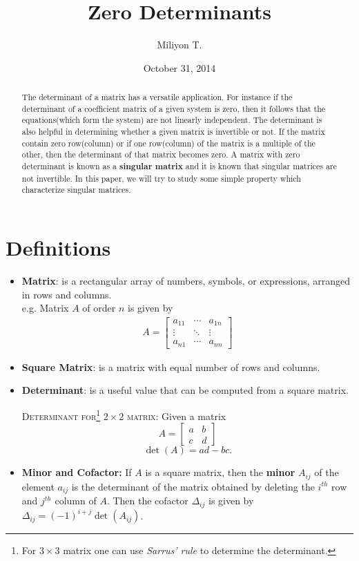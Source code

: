 \documentclass[12pt]{article}
\theoremstyle{definition}
\theoremstyle{remark}
\begin{document}
\nocite{}

\title{Zero Determinants}
\date{October 31, 2014}
\author{Miliyon T.}
\maketitle

\begin{abstract}
  The determinant of a matrix has a versatile application. For instance if the determinant of a coefficient matrix of a given system is zero, then it follows that the equations(which form the system) are not linearly independent. The determinant is also helpful in determining whether a given matrix is invertible or not. If the matrix contain zero row(column) or if one row(column) of the matrix is a multiple of the other, then the determinant of that matrix becomes zero. A matrix with zero determinant is known as a \textbf{singular matrix} and it is known that singular matrices are not invertible. In this paper, we will try to study some simple property which characterize singular matrices.
\end{abstract}

\section{Definitions}

\begin{itemize}
\item \textbf{Matrix}: is a rectangular array of numbers, symbols, or expressions,
arranged in rows and columns.\\
e.g. Matrix $A$ of order $n$ is given by
  \begin{gather*}
  A = \begin{bmatrix}
      a_{11}  & \cdots & a_{1n} \\
      \vdots  & \ddots & \vdots \\
      a_{n1}  & \cdots & a_{nn}
    \end{bmatrix}
  \end{gather*}

\item \textbf{Square Matrix}: is a matrix with equal number of rows and columns.

\item \textbf{Determinant}: is a useful value that can be computed from a square matrix.

\textmd{\textsc{Determinant for\footnote{For $3\times3$ matrix one can use \textit{Sarrus' rule} to determine the determinant.} $2\times 2$ matrix}}:
Given a matrix
\[
  A = \begin{bmatrix}
      a   & b \\
       c  & d
    \end{bmatrix}
\]
\[
\det(A)=ad-bc.
\]
\item \textbf{Minor and Cofactor:} If $A$ is a square matrix, then the \textbf{minor} $A_{ij}$ of the element $a_{ij}$ is the determinant of the matrix obtained by deleting the $i^{th}$ row and $j^{th}$ column of $A$. Then the cofactor $\Delta_{ij}$ is given by $\Delta_{ij} =(-1)^{i+j}  \det(A_{ij})$.
\end{itemize}
\end{document}
